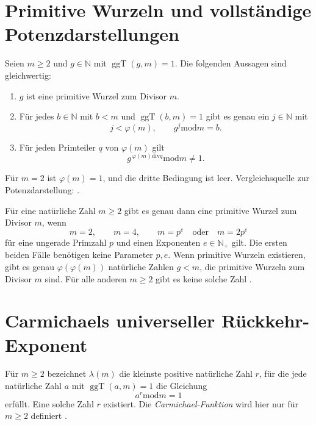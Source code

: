 \section{Primitive Wurzeln und vollständige Potenzdarstellungen}

\begin{theorem}
\label{b10guide:thm:primitive-root-characterizations}
Seien $m\ge2$ und $g\in\mathbb N$ mit $\operatorname{ggT}(g,m)=1$.
Die folgenden Aussagen sind gleichwertig:
\begin{enumerate}
 \item $g$ ist eine primitive Wurzel zum Divisor $m$.
 \item Für jedes $b\in\mathbb N$ mit $b<m$ und
       $\operatorname{ggT}(b,m)=1$ gibt es genau ein
       $j\in\mathbb N$ mit
       \[
        j<\varphi(m),\qquad g^j\mathbin{\mathrm{mod}}m=b.
       \]
 \item Für jeden Primteiler $q$ von $\varphi(m)$ gilt
       \[
        g^{\,\varphi(m)\mathbin{\mathrm{div}}q}
        \mathbin{\mathrm{mod}}m\ne1.
       \]
\end{enumerate}
Für $m=2$ ist $\varphi(m)=1$, und die dritte Bedingung ist leer.
Vergleichsquelle zur Potenzdarstellung: \cite{natprimroots}.
\end{theorem}

\begin{theorem}
\label{b10guide:thm:primitive-root-existence-count}
Für eine natürliche Zahl $m\ge2$ gibt es genau dann eine primitive
Wurzel zum Divisor $m$, wenn
\[
 m=2,\qquad m=4,\qquad m=p^e\quad\text{oder}\quad m=2p^e
\]
für eine ungerade Primzahl $p$ und einen Exponenten
$e\in\mathbb N_+$ gilt. Die ersten beiden Fälle benötigen
keine Parameter $p,e$.
Wenn primitive Wurzeln existieren, gibt es genau
$\varphi(\varphi(m))$ natürliche Zahlen $g<m$, die primitive
Wurzeln zum Divisor $m$ sind. Für alle anderen $m\ge2$ gibt es
keine solche Zahl \cite{natprimroots}.
\end{theorem}

\section{Carmichaels universeller Rückkehr-Exponent}

\begin{definition}
\label{b10guide:def:carmichael-function}
Für $m\ge2$ bezeichnet $\lambda(m)$ die kleinste positive natürliche
Zahl $r$, für die jede natürliche Zahl $a$ mit
$\operatorname{ggT}(a,m)=1$ die Gleichung
\[
 a^r\mathbin{\mathrm{mod}}m=1
\]
erfüllt. Eine solche Zahl $r$ existiert.
Die \emph{Carmichael-Funktion} wird hier nur für $m\ge2$ definiert
\cite{natcarmichael}.
\end{definition}

